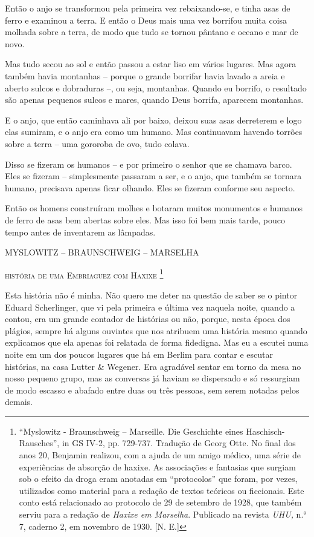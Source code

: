 Então o anjo se transformou pela primeira vez rebaixando-se, e tinha
asas de ferro e examinou a terra. E então o Deus mais uma vez borrifou
muita coisa molhada sobre a terra, de modo que tudo se tornou pântano e
oceano e mar de novo.

Mas tudo secou ao sol e então passou a estar liso em vários lugares. Mas
agora também havia montanhas -- porque o grande borrifar havia lavado a
areia e aberto sulcos e dobraduras --, ou seja, montanhas. Quando eu
borrifo, o resultado são apenas pequenos sulcos e mares, quando Deus
borrifa, aparecem montanhas.

E o anjo, que então caminhava ali por baixo, deixou suas asas derreterem
e logo elas sumiram, e o anjo era como um humano. Mas continuavam
havendo torrões sobre a terra -- uma gororoba de ovo, tudo colava.

Disso se fizeram os humanos -- e por primeiro o senhor que se chamava
barco. Eles se fizeram -- simplesmente passaram a ser, e o anjo, que
também se tornara humano, precisava apenas ficar olhando. Eles se
fizeram conforme seu aspecto.

Então os homens construíram molhes e botaram muitos monumentos e humanos
de ferro de asas bem abertas sobre eles. Mas isso foi bem mais tarde,
pouco tempo antes de inventarem as lâmpadas.

MYSLOWITZ -- BRAUNSCHWEIG -- MARSELHA

\textsc{história de uma Embriaguez com Haxixe} \footnote{``Myslowitz -
  Braunschweig -- Marseille. Die Geschichte eines Haschisch-Rausches'',
  in GS IV-2, pp. 729-737. Tradução de Georg Otte. No final dos anos 20,
  Benjamin realizou, com a ajuda de um amigo médico, uma série de
  experiências de absorção de haxixe. As associações e fantasias que
  surgiam sob o efeito da droga eram anotadas em ``protocolos'' que
  foram, por vezes, utilizados como material para a redação de textos
  teóricos ou ficcionais. Este conto está relacionado ao protocolo de 29
  de setembro de 1928, que também serviu para a redação de \emph{Haxixe
  em Marselha}. Publicado na revista \emph{UHU,} n.° 7, caderno 2, em
  novembro de 1930. {[}N. E.{]}}

Esta história não é minha. Não quero me deter na questão de saber se o
pintor Eduard Scherlinger, que vi pela primeira e última vez naquela
noite, quando a contou, era um grande contador de histórias ou não,
porque, nesta época dos plágios, sempre há alguns ouvintes que nos
atribuem uma história mesmo quando explicamos que ela apenas foi
relatada de forma fidedigna. Mas eu a escutei numa noite em um dos
poucos lugares que há em Berlim para contar e escutar histórias, na casa
Lutter \& Wegener. Era agradável sentar em torno da mesa no nosso
pequeno grupo, mas as conversas já haviam se dispersado e só ressurgiam
de modo escasso e abafado entre duas ou três pessoas, sem serem notadas
pelos demais.

